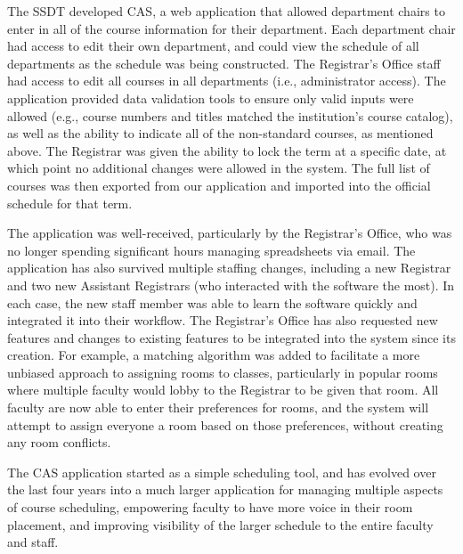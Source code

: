 The SSDT developed CAS, a web application that allowed department chairs to enter in all of the course information for their department. Each department chair had access to edit their own department, and could view the schedule of all departments as the schedule was being constructed. The Registrar's Office staff had access to edit all courses in all departments (i.e., administrator access). The application provided data validation tools to ensure only valid inputs were allowed (e.g., course numbers and titles matched the institution's course catalog), as well as the ability to indicate all of the non-standard courses, as mentioned above. The Registrar was given the ability to lock the term at a specific date, at which point no additional changes were allowed in the system. The full list of courses was then exported from our application and imported into the official schedule for that term. 

The application was well-received, particularly by the Registrar's Office, who was no longer spending significant hours managing spreadsheets via email. The application has also survived multiple staffing changes, including a new Registrar and two new Assistant Registrars (who interacted with the software the most). In each case, the new staff member was able to learn the software quickly and integrated it into their workflow. The Registrar's Office has also requested new features and changes to existing features to be integrated into the system since its creation. For example, a matching algorithm was added to facilitate a more unbiased approach to assigning rooms to classes, particularly in popular rooms where multiple faculty would lobby to the Registrar to be given that room. All faculty are now able to enter their preferences for rooms, and the system will attempt to assign everyone a room based on those preferences, without creating any room conflicts. 

The CAS application started as a simple scheduling tool, and has evolved over the last four years into a much larger application for managing multiple aspects of course scheduling, empowering faculty to have more voice in their room placement, and improving visibility of the larger schedule to the entire faculty and staff.

